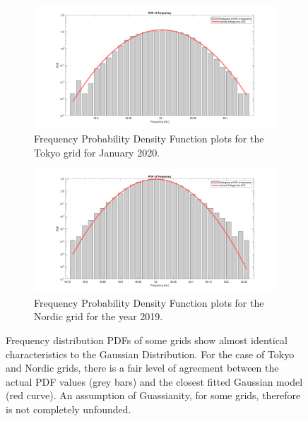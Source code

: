 \begin{figure}[!ht]
	\centering
	\begin{subfigure}{\textwidth}
		\centering
		\includegraphics[scale=0.25]{../figures/pdf/pdf_frequency_tokyo_2020_01}
		\caption{Frequency Probability Density Function plots for the Tokyo grid for January 2020.}
	\end{subfigure}

	\begin{subfigure}{\textwidth}
		\centering
		\includegraphics[scale=0.25]{../figures/pdf/pdf_frequency_nordic_2019}
		\caption{Frequency Probability Density Function plots for the Nordic grid for the year 2019.}
	\end{subfigure}
	\caption{Frequency distribution PDFs of some grids show almost identical characteristics to the Gaussian Distribution. For the case of Tokyo and Nordic grids, there is a fair level of agreement between the actual PDF values (grey bars) and the closest fitted Gaussian model (red curve). An assumption of Guassianity, for some grids, therefore is not completely unfounded.}
\end{figure}

